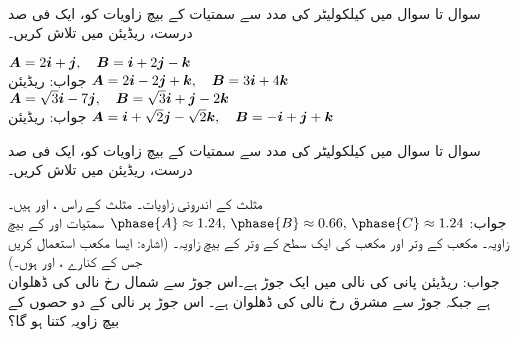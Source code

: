\\
سوال  تا سوال  میں کیلکولیٹر کی مدد سے سمتیات کے بیچ زاویات کو، ایک فی صد درست، ریڈیئن میں  تلاش کریں۔

${{\boldsymbol{A}}}=2{\boldsymbol{i}}+{\boldsymbol{j}},\quad {\ensuremath{{\boldsymbol{B}}}}={\boldsymbol{i}}+2{\boldsymbol{j}}-{\boldsymbol{k}}$\\
جواب:\quad
{} ریڈیئن
${{\boldsymbol{A}}}=2{\boldsymbol{i}}-2{\boldsymbol{j}}+{\boldsymbol{k}},\quad {\ensuremath{{\boldsymbol{B}}}}=3{\boldsymbol{i}}+4{\boldsymbol{k}}$
${{\boldsymbol{A}}}=\sqrt{3}{\boldsymbol{i}}-7{\boldsymbol{j}},\quad {\ensuremath{{\boldsymbol{B}}}}=\sqrt{3}{\boldsymbol{i}}+{\boldsymbol{j}}-2{\boldsymbol{k}}$\\
جواب:\quad
{} ریڈیئن
${{\boldsymbol{A}}}={\boldsymbol{i}}+\sqrt{2}{\boldsymbol{j}}-\sqrt{2}{\boldsymbol{k}},\quad {\ensuremath{{\boldsymbol{B}}}}=-{\boldsymbol{i}}+{\boldsymbol{j}}+{\boldsymbol{k}}$

سوال  تا سوال  میں کیلکولیٹر کی مدد سے سمتیات کے بیچ زاویات کو، ایک فی صد درست، ریڈیئن میں  تلاش کریں۔

مثلث  کے اندرونی زاویات۔ مثلث کے راس ،  اور  ہیں۔\\
جواب:\quad
$\phase{A}\approx 1.24,\,\phase{B}\approx 0.66,\,\phase{C}\approx 1.24$
سمتیات  اور  کے بیچ زاویہ۔
مکعب کے وتر اور مکعب کی ایک سطح کے وتر کے بیچ زاویہ۔ (اشارہ: ایسا مکعب استعمال کریں جس کے کنارے ،  اور  ہوں۔)\\
جواب:\quad
{} ریڈیئن
پانی کی نالی میں ایک جوڑ ہے۔اس جوڑ سے  شمال رخ نالی کی ڈھلوان  ہے جبکہ جوڑ سے مشرق رخ نالی کی ڈھلوان  ہے۔ اس جوڑ پر نالی کے دو حصوں کے بیچ زاویہ کتنا ہو گا؟

